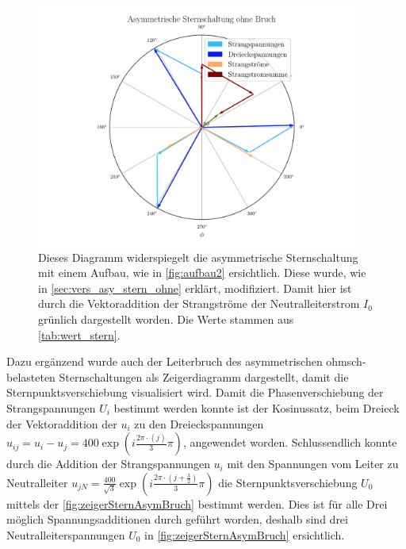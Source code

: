 \documentclass[12pt,english,ngerman]{scrartcl}
\begin{document}
\begin{figure}[H]
	\begin{center}
		\includegraphics[width = 0.95\textwidth]{figures/zeigerSternAsymOhneBruch.pdf}
	\end{center}
	\caption[Zeigerdiagramm einer asymmetrisch ohmsch-belastete Sternschaltung ohne
		Neutralleiterbruch]{Dieses Diagramm widerspiegelt die asymmetrische
		Sternschaltung mit einem Aufbau, wie in \autoref{fig:aufbau2} ersichtlich.
		Diese wurde, wie in \autoref{sec:vers_asy_stern_ohne} erklärt, modifiziert.
		Damit hier ist durch die Vektoraddition der Strangströme der Neutralleiterstrom
		$I_0$ grünlich dargestellt worden. Die Werte stammen aus
		\autoref{tab:wert_stern}.
	}\label{fig:zeigerSternAsymOhneBruch}
\end{figure}

Dazu ergänzend wurde auch der Leiterbruch des asymmetrischen ohmsch-belasteten
Sternschaltungen als Zeigerdiagramm dargestellt, damit die
Sternpunktsverschiebung visualisiert wird. Damit die Phasenverschiebung der
Strangspannungen $U_i$ bestimmt werden konnte ist der Kosinussatz, beim Dreieck
der Vektoraddition der $u_i$ zu den Dreieckspannungen $u_{ij} = u_i-u_j =
	400\exp(i\frac{2\pi\cdot(j)}{3}\pi)$, angewendet worden. Schlussendlich konnte
durch die Addition der Strangspannungen $u_i$ mit den Spannungen vom Leiter zu
Neutralleiter $u_{jN} =
	\frac{400}{\sqrt{3}}\exp(i\frac{2\pi\cdot(j+\frac{3}{2})}{3}\pi)$ die
Sternpunktsverschiebung $U_0$ mittels der \autoref{fig:zeigerSternAsymBruch}
bestimmt werden. Dies ist für alle Drei möglich Spannungsadditionen durch
geführt worden, deshalb sind drei Neutralleiterspannungen $U_0$ in
\autoref{fig:zeigerSternAsymBruch} ersichtlich.
\end{document}
